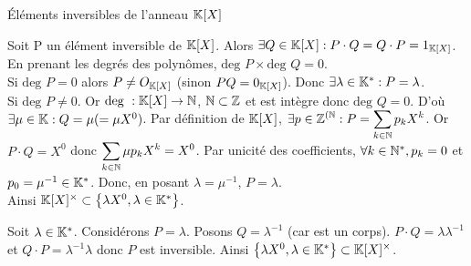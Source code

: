 \documentclass{article}
\date{10 Mars 2024}
\begin{document}
\maketitle

\begin{question_kholle}
	[{\begin{equation}
		\K[X] ^\times = \left\{ \lambda X^0, \lambda \in \K^* \right\}
	\end{equation}}]
	{Éléments inversibles de l'anneau $\mathbb K[X]$}
	
	Soit P un élément inversible de $\mathbb K[X]$.
	Alors $\exists Q \in \mathbb K[X] : P \cdot Q = Q \cdot P = 1_{\mathbb K[X]}$.
	En prenant les degrés des polynômes, $\text{deg } P \times \text{deg } Q = 0$. \\
	Si $\text{deg } P = 0$ alors $P \neq O_ {\mathbb K[X]}$ (sinon $PQ = 0_{\mathbb K[X]}$). Donc $\exists \lambda \in \mathbb K^* : P = \lambda$. \\
	Si $\text{deg } P \neq 0$. Or $\text{deg } : \mathbb K[X] \rightarrow \mathbb N$, $\mathbb N \subset \mathbb Z$ et \Z est intègre donc $\text{deg } Q = 0$. D'où $\exists \mu \in \mathbb K : Q = \mu (= \mu X^0)$. Par définition de $\mathbb K[X]$, $\displaystyle \exists p \in \mathbb Z^{(\mathbb N} : P = \sum_{k \in \mathbb N} p_k X^k$. Or $P \cdot Q = X^0$ donc $\displaystyle \sum_{k \in \mathbb N} \mu p_k X^k = X^0$. Par unicité des coefficients, $\forall k \in \mathbb N^*, p_k = 0$ et $p_0 = \mu^{-1} \in \mathbb K^*$. Donc, en posant $\lambda = \mu^{-1}$, $P = \lambda$. \\
	Ainsi $\mathbb K[X]^\times \subset \left\{ \lambda X^0, \lambda \in \mathbb K^* \right\}$.
	
	Soit $\lambda \in \mathbb K^*$. Considérons $P = \lambda$.
	Posons $Q = \lambda^{-1}$ (car \K est un corps). $P \cdot Q = \lambda \lambda^{-1}$ et $Q \cdot P = \lambda^{-1} \lambda$ donc $P$ est inversible. Ainsi $\left\{ \lambda X^0, \lambda \in \mathbb K^* \right\} \subset \mathbb K[X]^\times$.
\end{question_kholle}
\end{document}
